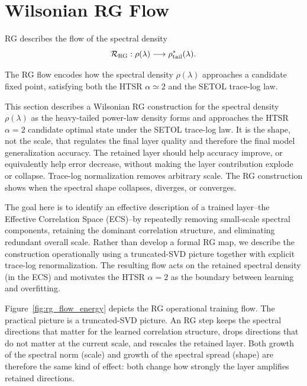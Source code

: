 \documentclass[10pt,twocolumn]{article}
\newcommand{\takeaway}[1]{%
  \par\vspace{4pt}\noindent\textcolor{boxblue}{#1}%
}
\newcommand{\eqtight}[1]{\[\vspace{-1pt}#1\vspace{-3pt}\]}
\begin{document}
\section{Wilsonian RG Flow}
\label{sxn:rg}
\vspace{0.35em}


\begin{tcolorbox}[marginalbox,title=\textbf{8. RG Flow}]
  RG describes the flow of the spectral density
  \eqtight{\mathcal{R}_{\mathrm{RG}}:\rho(\lambda)\longrightarrow \rho_{\rm tail}^{*}(\lambda).}
  \takeaway{The RG flow encodes how the spectral density $\rho(\lambda)$ approaches a candidate fixed point,
    satisfying both the HTSR $\alpha\simeq 2$ and the SETOL trace-log law.}
\end{tcolorbox}

This section describes a Wilsonian RG construction for the
spectral density $\rho(\lambda)$ as the heavy-tailed power-law density forms
and approaches the HTSR $\alpha=2$ candidate optimal state under the SETOL trace-log law.
It is the shape, not the scale, that regulates the final layer quality and therefore the final model generalization accuracy.
The retained layer should help accuracy improve, or equivalently help error decrease,
without making the layer contribution explode or collapse. 
Trace-log normalization removes arbitrary scale.
The RG construction shows when the spectral shape collapses, diverges, or converges.

The goal here  is to identify an effective description of a trained
layer--the Effective Correlation Space (ECS)--by repeatedly removing
small-scale spectral components, retaining the dominant
correlation structure, and eliminating redundant overall scale.
Rather than develop a formal RG map, we describe the
construction operationally using a truncated-SVD picture
together with explicit trace-log renormalization. The resulting
flow acts on the retained spectral density (in the ECS)
and motivates the HTSR $\alpha=2$ as the boundary between
learning and overfitting.

Figure~\ref{fig:rg_flow_energy} depicts the RG operational training flow. 
The practical picture is a truncated-SVD picture. An RG step keeps the spectral directions that matter for the learned correlation structure, drops directions that do not matter at the current scale, and rescales the retained layer.  Both growth of the spectral norm (scale) and growth of the spectral spread (shape) are therefore the same kind of effect: both change how strongly the layer amplifies retained directions.
\end{document}
